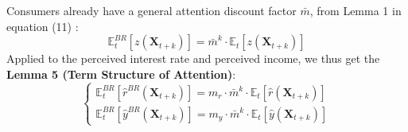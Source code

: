 \documentclass{beamer}
\begin{document}
\begin{frame}{\subsecname}
    Consumers already have a general attention discount factor $\bar{m}$, from Lemma 1 in equation (11) :
    \begin{equation*}\tag{11}
        \mathbb{E}_{t}^{BR}\left[z\left(\bm{X}_{t+k}\right)\right]=\bar{m}^{k}\cdot\mathbb{E}_{t}\left[z\left(\bm{X}_{t+k}\right)\right]
    \end{equation*}
    Applied to the perceived interest rate and perceived income, we thus get the \textbf{Lemma 5 (Term Structure of Attention)}:
    \begin{equation}\tag{51}
        \begin{cases}
            \mathbb{E}_{t}^{BR}\left[\hat{r}^{BR}(\textbf{X}_{t+k})\right]=m_{r}\cdot\bar{m}^{k}\cdot\mathbb{E}_{t}\left[\hat{r}(\textbf{X}_{t+k})\right] \\
            \mathbb{E}_{t}^{BR}\left[\hat{y}^{BR}(\textbf{X}_{t+k})\right]=m_{y}\cdot\bar{m}^{k}\cdot\mathbb{E}_{t}\left[\hat{y}(\textbf{X}_{t+k})\right]
        \end{cases}
    \end{equation}
\end{frame}
\end{document}
